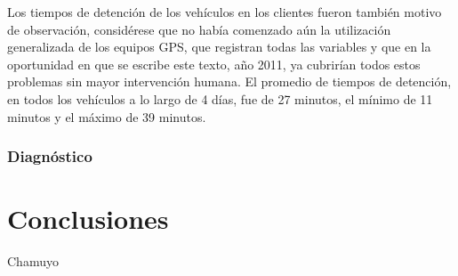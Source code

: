 \documentclass[a4paper,10pt]{article}
\begin{document}
	Los tiempos de detención de los vehículos en los clientes fueron también motivo de observación, considérese que no había comenzado aún la utilización generalizada de los equipos GPS, que registran todas las variables y que en la oportunidad en que se escribe este texto, año 2011, ya cubrirían todos estos problemas sin mayor intervención humana. El promedio de tiempos de detención, en todos los vehículos a lo largo de 4 días, fue de 27 minutos, el mínimo de 11 minutos y el máximo de 39 minutos.
	
	\subsubsection{Diagnóstico}
	
	
\section{Conclusiones}
Chamuyo

\end{document}
